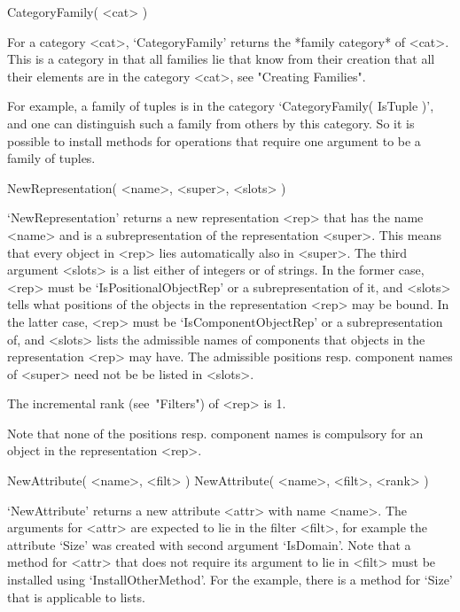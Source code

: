 \>CategoryFamily( <cat> )

For a category <cat>,
`CategoryFamily' returns the *family category* of <cat>.
This is a category in that all families lie that know from their
creation that all their elements are in the category <cat>,
see "Creating Families".

For example, a family of tuples is in the category
`CategoryFamily( IsTuple )',
and one can distinguish such a family from others by this category.
So it is possible to install methods for operations that require one
argument to be a family of tuples.



\>NewRepresentation( <name>, <super>, <slots> )

`NewRepresentation' returns a new representation <rep> that has the name
<name> and is a subrepresentation of the representation <super>.
This means that every object in <rep> lies automatically also in <super>.
The third argument <slots> is a list either of integers or of strings.
In the former case, <rep> must be `IsPositionalObjectRep' or a
subrepresentation of it, and <slots> tells what positions of the objects
in the representation <rep> may be bound.
In the latter case, <rep> must be `IsComponentObjectRep' or a
subrepresentation of, and <slots> lists the admissible names of
components that objects in the representation <rep> may have.
The admissible positions resp. component names of <super> need not be
be listed in <slots>.

The incremental rank (see~"Filters") of <rep> is 1.

Note that none of the positions resp. component names is compulsory for
an object in the representation <rep>.



\>NewAttribute( <name>, <filt> )
\)NewAttribute( <name>, <filt>, <rank> )

`NewAttribute' returns a new attribute <attr> with name <name>.
The arguments for <attr> are expected to lie in the filter <filt>,
for example the attribute `Size' was created with second argument
`IsDomain'.
Note that a method for <attr> that does not require its argument to lie
in <filt> must be installed using `InstallOtherMethod'.
For the example, there is a method for `Size' that is applicable to
lists.

